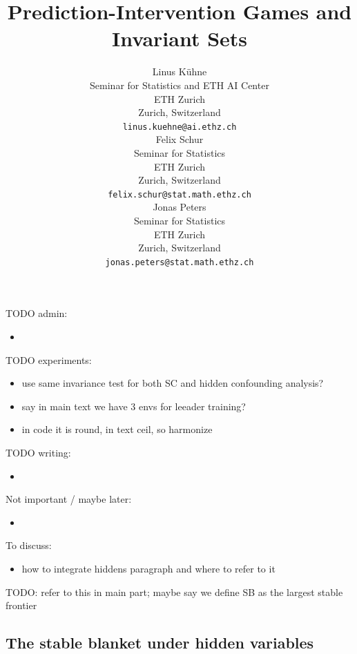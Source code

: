 \documentclass{article}
\title{
Prediction-Intervention Games and Invariant Sets
}
\author{%
    Linus K\"uhne \\
    Seminar for Statistics and ETH AI Center\\
    ETH Zurich\\
    Zurich, Switzerland \\
    \texttt{linus.kuehne@ai.ethz.ch} \\
    \And
    Felix Schur \\
    Seminar for Statistics\\
    ETH Zurich\\
    Zurich, Switzerland \\
    \texttt{felix.schur@stat.math.ethz.ch} \\
    \And
    Jonas Peters \\
    Seminar for Statistics\\
    ETH Zurich\\
    Zurich, Switzerland \\
    \texttt{jonas.peters@stat.math.ethz.ch}
  }
\begin{document}
TODO admin:
\begin{itemize}
\item 
\end{itemize}

TODO experiments:
\begin{itemize}
\item use same invariance test for both SC and hidden confounding analysis?
\item say in main text we have 3 envs for leeader training?
\item in code it is round, in text ceil, so harmonize
\end{itemize}

TODO writing:
\begin{itemize}
    \item 
\end{itemize}

Not important / maybe later:
\begin{itemize}
    \item 
\end{itemize}

To discuss:
\begin{itemize}
    \item how to integrate hiddens paragraph and where to refer to it
\end{itemize}

\newpage




TODO: refer to this in main part; maybe say we define SB as the largest stable frontier
\subsection{The stable blanket under hidden variables} \label{app:stable_blanket_hidden}
\end{document}
